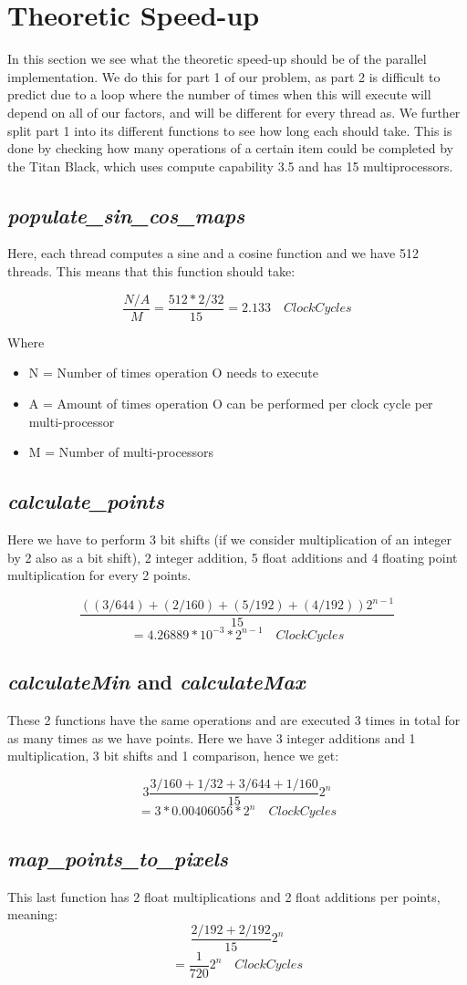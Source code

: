 \section{Theoretic Speed-up}
In this section we see what the theoretic speed-up should be of the parallel implementation. We do this for part 1 of our problem, as part 2 is difficult to predict due to a loop where the number of times when this will execute will depend on all of our factors, and will be different for every thread as. We further split part 1 into its different functions to see how long each should take. This is done by checking how many operations of a certain item could be completed by the Titan Black, which uses compute capability 3.5 and has 15 multiprocessors.

\subsection{\textit{populate\_sin\_cos\_maps}}
Here, each thread computes a sine and a cosine function and we have 512 threads. This means that this function should take:

\[\frac{N/A}{M} = \frac{512 * 2 / 32} {15} = 2.133 \quad ClockCycles\]

Where 
\begin{itemize}
	\item N = Number of times operation O needs to execute
	\item A = Amount of times operation O can be performed per clock cycle per multi-processor
	\item M = Number of multi-processors
\end{itemize}

\subsection{\textit{calculate\_points}}
Here we have to perform 3 bit shifts (if we consider multiplication of an integer by 2 also as a bit shift), 2 integer addition, 5 float additions and 4 floating point multiplication for every 2 points.

\[ \frac{((3/644) + (2/160) + (5/192) + (4/192))2^{n-1}}{15} \]
\[=4.26889*10^{-3}*2^{n-1} \quad ClockCycles\]

\subsection{\textit{calculateMin} and \textit{calculateMax}}
These 2 functions have the same operations and are executed 3 times in total for as many times as we have points. Here we have 3 integer additions and 1 multiplication, 3 bit shifts and 1 comparison, hence we get:

\[3\frac{3/160 + 1/32 + 3/644 + 1/160}{15}2^{n}\]
\[=3*0.00406056*2^n \quad ClockCycles\]

\subsection{\textit{map\_points\_to\_pixels}}
This last function has 2 float multiplications and 2 float additions per points, meaning:
\[\frac{2/192 + 2/192}{15}2^{n}\]
\[=\frac{1}{720}2^n \quad ClockCycles\]